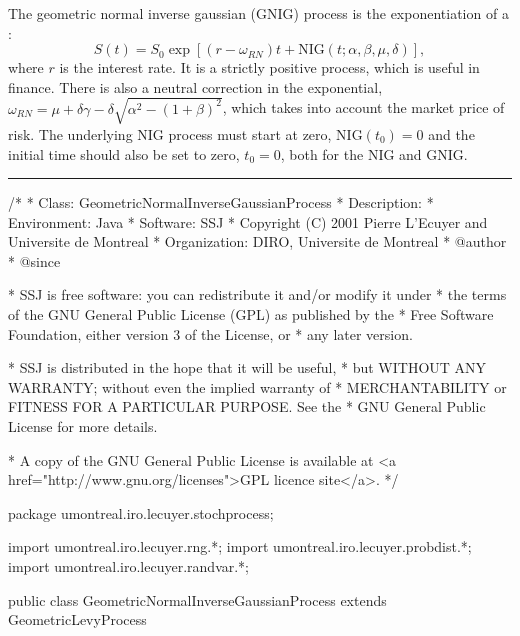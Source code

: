 

The geometric normal inverse gaussian (GNIG) process
is the exponentiation of a :
\begin{equation}
S(t) = S_0 \exp\left[ (r-\omega_{RN})t + \mbox{NIG}(t;\alpha,\beta,\mu,\delta) \right],
\end{equation}
where  $r$  is the interest rate.
It is a strictly positive process, which is useful in finance.
There is also a neutral
correction in the exponential, $\omega_{RN}= \mu + \delta\gamma-\delta
\sqrt{\alpha^2-(1+\beta)^2}$,
which takes into account the market price of risk.
The underlying NIG process must start at zero, NIG$(t_0) = 0 $
and the initial time should also be set to zero, $t_0 = 0$,
both for the NIG and GNIG.

\bigskip\hrule\bigskip

\begin{code}
\begin{hide}
/*
 * Class:        GeometricNormalInverseGaussianProcess
 * Description:  
 * Environment:  Java
 * Software:     SSJ 
 * Copyright (C) 2001  Pierre L'Ecuyer and Universite de Montreal
 * Organization: DIRO, Universite de Montreal
 * @author       
 * @since

 * SSJ is free software: you can redistribute it and/or modify it under
 * the terms of the GNU General Public License (GPL) as published by the
 * Free Software Foundation, either version 3 of the License, or
 * any later version.

 * SSJ is distributed in the hope that it will be useful,
 * but WITHOUT ANY WARRANTY; without even the implied warranty of
 * MERCHANTABILITY or FITNESS FOR A PARTICULAR PURPOSE.  See the
 * GNU General Public License for more details.

 * A copy of the GNU General Public License is available at
   <a href="http://www.gnu.org/licenses">GPL licence site</a>.
 */
\end{hide}
package umontreal.iro.lecuyer.stochprocess;\begin{hide}
import umontreal.iro.lecuyer.rng.*;
import umontreal.iro.lecuyer.probdist.*;
import umontreal.iro.lecuyer.randvar.*;

\end{hide}

public class GeometricNormalInverseGaussianProcess extends
                                                   GeometricLevyProcess \begin{hide} {
\end{hide}
\end{code}%
